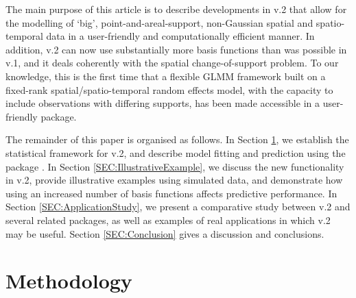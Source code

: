 \documentclass[article]{jss}
\begin{document}

 The main purpose of this article is to describe developments in  v.2 that allow for the modelling of `big', point-and-areal-support, non-Gaussian spatial and spatio-temporal data in a user-friendly and computationally efficient manner. 
 In addition,  v.2 can now use substantially more basis functions than was possible in  v.1, and it deals coherently with the spatial change-of-support problem. 
To our knowledge, this is the first time that a flexible GLMM framework built on a fixed-rank spatial/spatio-temporal random effects model, with the capacity to include observations with differing supports, has been made accessible in a user-friendly package. 


The remainder of this paper is organised as follows. 
In Section \ref{SEC:Methodology}, we establish the statistical framework for  v.2, and describe model fitting and prediction using the  package  \citep{Kristensen_2016_TMB}. 
In Section \ref{SEC:IllustrativeExample}, we discuss the new functionality in  v.2, provide illustrative examples using simulated data, %
 and demonstrate how using an increased number of basis functions affects predictive performance. %
In Section \ref{SEC:ApplicationStudy}, we present a comparative study between  v.2 and several related packages, as well as examples of real applications in which  v.2 may be useful.  
Section \ref{SEC:Conclusion} gives a discussion and conclusions. 

\section{Methodology}\label{SEC:Methodology}
\end{document}
